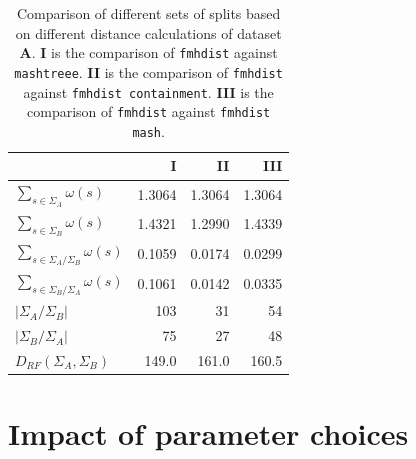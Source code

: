 \begin{table}[]
  \centering
  \begin{tabular}{@{}lrrr@{}}
    \toprule
    &  \textbf{I} & \textbf{II} & \textbf{III} \\
    \midrule
  $\sum_{s \in \Sigma_A}{\omega(s)}$           & 1.3064                     & 1.3064                              & 1.3064                         \\
  $\sum_{s \in \Sigma_B}{\omega(s)}$           & 1.4321                     & 1.2990                              & 1.4339                         \\
  $\sum_{s \in \Sigma_A / \Sigma_B}{\omega(s)}$ & 0.1059                    & 0.0174                              & 0.0299                      \\
  $\sum_{s \in \Sigma_B / \Sigma_A}{\omega(s)}$ & 0.1061                    & 0.0142                             & 0.0335                       \\
  $|\Sigma_A / \Sigma_B|$                       & 103                       & 31                                 & 54                                        \\
  $|\Sigma_B / \Sigma_A|$                       & 75                        & 27                                 & 48                                        \\
  $D_{RF}(\Sigma_A, \Sigma_B)$                 & 149.0                       & 161.0                                & 160.5         \\
  \bottomrule                           
  \end{tabular}
  \caption[Comparison of different sets of splits based on different distance
  calculations of dataset \textbf{A}]{Comparison of different sets of splits
  based on different distance calculations of dataset \textbf{A}. \textbf{I} is
  the comparison of \texttt{fmhdist} against \texttt{mashtreee}. \textbf{II} is
  the comparison of \texttt{fmhdist} against \texttt{fmhdist containment}.
  \textbf{III} is the comparison of \texttt{fmhdist} against \texttt{fmhdist
  mash}.}
  \label{ta:splitDifferences}
\end{table}


\section{Impact of parameter choices}
